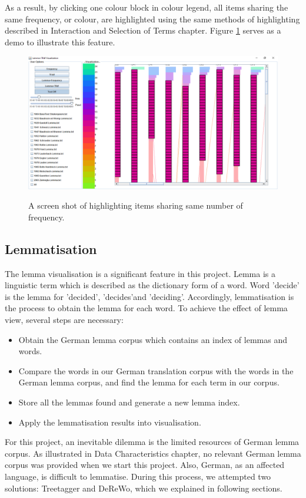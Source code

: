 As a result, by clicking one colour block in colour legend, all items sharing the same frequency, or colour, are highlighted using the same methods of highlighting described in Interaction and Selection of Terms chapter. Figure \ref{fig:interactiveColourMapping} serves as a demo to illustrate this feature.
\begin{figure}[H]
	\centering	
	\includegraphics[width=\textwidth]{Figs/Colour-Legend-Interation}\\[1ex]
	\caption{A screen shot of highlighting items sharing same number of frequency.}
	\label{fig:interactiveColourMapping}
\end{figure} 

\subsection{Lemmatisation}

The lemma visualisation is a significant feature in this project. Lemma is a linguistic term which is described as the dictionary form of a word. Word 'decide' is the lemma for 'decided', 'decides'and 'deciding'. Accordingly, lemmatisation is the process to obtain the lemma for each word. To achieve the effect of lemma view, several steps are necessary:
\begin{itemize}
	\item \textbf{} Obtain the German lemma corpus which contains an index of lemmas and words.
	\item \textbf{} Compare the words in our German translation corpus with the words in the German lemma corpus, and find the lemma for each term in our corpus.
	\item \textbf{} Store all the lemmas  found and generate a new lemma index.
	\item \textbf{} Apply the lemmatisation results into visualisation.
\end{itemize}
For this project, an inevitable dilemma is the limited resources of German lemma corpus. As illustrated in Data Characteristics chapter, no relevant German lemma corpus was provided when we start this project. Also, German, as an affected language, is difficult to lemmatise. During this process, we attempted two solutions: Treetagger and DeReWo, which we explained in following sections.

